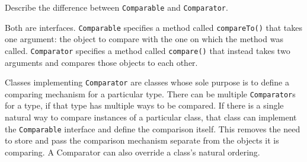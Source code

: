 Describe the difference between \texttt{Comparable} and \texttt{Comparator}. \\
\begin{answer}
Both are interfaces.
\texttt{Comparable} specifies a method called \texttt{compareTo()} that takes one argument: the object to compare with the one on which the method was called.
\texttt{Comparator} specifies a method called \texttt{compare()} that instead takes two arguments and compares those objects to each other.

Classes implementing \texttt{Comparator} are classes whose sole purpose is to define a comparing mechanism for a particular type. There can be multiple \texttt{Comparator}s for a type, if that type has multiple ways to be compared. If there is a single natural way to compare instances of a particular class, that class can implement the \texttt{Comparable} interface and define the comparison itself. This removes the need to store and pass the comparison mechanism separate from the objects it is comparing.
A Comparator can also override a class's natural ordering.
\end{answer}
